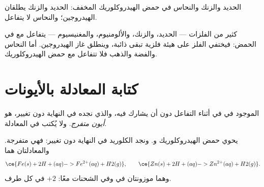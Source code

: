 \begin{omfigure}

{\small الحديد والزنك والنحاس في حمض الهيدروكلوريك المخفف: الحديد والزنك
يطلقان الهيدروجين؛ والنحاس لا يتفاعل.}
\end{omfigure}

\begin{proposition}\label{prop:g9:metals-acids-corrosion:acid}
كثير من الفلزات --- الحديد، والزنك، والألومنيوم، والمغنيسيوم --- يتفاعل مع
  في الحمض: فيختفي الفلز على هيئة  فلزية تبقى ذائبة،
وينطلق غاز الهيدروجين. أما النحاس والفضة والذهب فلا تتفاعل مع حمض
الهيدروكلوريك.
\end{proposition}

\section{كتابة المعادلة بالأيونات}

\begin{definition}\label{def:g9:metals-acids-corrosion:spectator}
 الموجود في  في أثناء التفاعل دون أن يشارك فيه، والذي نجده في
النهاية دون تغيير، هو \emph{أيون
متفرج}. ولا يُكتب في المعادلة.
\end{definition}

\begin{example}\label{ex:g9:metals-acids-corrosion:iron}
يحوي حمض الهيدروكلوريك   و. ونجد 
الكلوريد في النهاية دون تغيير: فهي  متفرجة. والمعادلتان
هما
\[
  \ce{Fe(s) + 2H+(aq) -> Fe^{2+}(aq) + H2(g)}, \qquad
  \ce{Zn(s) + 2H+(aq) -> Zn^{2+}(aq) + H2(g)}.
\]
وهما موزونتان في  وفي الشحنات معًا: $+2$ في كل طرف.
\end{example}

